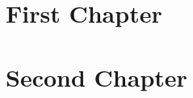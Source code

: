 \documentclass[12pt]{UWMadThesis}
\begin{document}
\MakeTitlePage{}

\begin{LicensePage}
    \CreativeCommons
    \Attribution
    \NonCommercial
    \ShareAlike
\end{LicensePage}

\TableOfContents

\acknowledgements{}
\lipsum[1]

\abstract
\lipsum[2-3]


\begin{Nomenclature}
\end{Nomenclature}


\chapter{First Chapter}
\lipsum[2-3]


\chapter{Second Chapter}
\lipsum[4-6]


\lipsum[7-9]


\lipsum[10-15]
\end{document}
